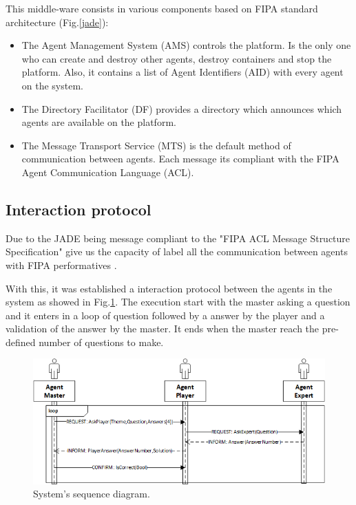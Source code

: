 \documentclass{llncs}
\begin{document}
This middle-ware consists in various components based on FIPA standard architecture (Fig.\ref{jade}):
\begin{itemize}
\item The Agent Management System (AMS) controls the platform. Is the only one who can create and destroy other agents, destroy containers and stop the platform. Also, it contains a list of Agent Identifiers (AID) with every agent on the system.
\item The Directory Facilitator (DF) provides a directory which announces which agents are available on the platform.
\item The Message Transport Service (MTS) is the default method of communication between agents. Each message its compliant with the FIPA Agent Communication Language (ACL).
\end{itemize}

\subsection{Interaction protocol}\label{sec:Interaction}

Due to the JADE being message compliant to the "FIPA ACL Message Structure Specification" give us the capacity of label all the communication between agents with FIPA performatives \cite{msg}.

With this, it was established a interaction protocol between the agents in the system as showed in Fig.\ref{sequence}. The execution start with the master asking a question and it enters in a loop of question followed by a answer by the player and a validation of the answer by the master. It ends when the master reach the pre-defined number of questions to make.

\begin{figure}
	\centering
    \includegraphics[width=1\textwidth]{sequence.png}
    \caption{System's sequence diagram.}
    \label{sequence}
\end{figure}
\end{document}
